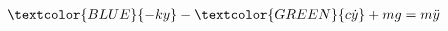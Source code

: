 \documentclass[preview]{standalone}
\begin{document}
\begin{align*}
\textcolor{BLUE}{-ky} - \textcolor{GREEN}{c\dot{y}} + mg = m \ddot{y}
\end{align*}
\end{document}
